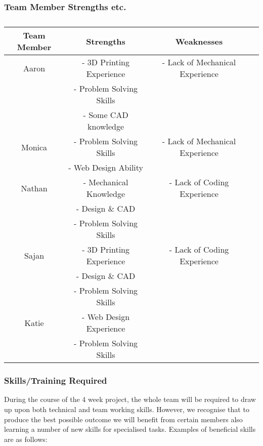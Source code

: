 \documentclass[12pt]{article}
\begin{document}
\subsubsection{Team Member Strengths etc.}
\begin{table}[!h]
\caption{}
\begin{center}
\begin{tabular}{|c|c|c|c|}
\hline
Team Member & Strengths & Weaknesses\\
 \hline
Aaron & - 3D Printing Experience & - Lack of Mechanical Experience\\
& - Problem Solving Skills & \\
& - Some CAD knowledge & \\
\hline
Monica & - Problem Solving Skills & - Lack of Mechanical Experience \\
& - Web Design Ability & \\
\hline
Nathan & - Mechanical Knowledge & - Lack of Coding Experience \\
& - Design \& CAD & \\
& - Problem Solving Skills &\\
\hline
Sajan & - 3D Printing Experience & - Lack of Coding Experience\\
& - Design \& CAD & \\
& - Problem Solving Skills &\\
\hline
Katie & - Web Design Experience & \\
& - Problem Solving Skills &\\
\hline
\end{tabular}
\end{center}
\label{default}
\end{table}

\subsubsection{Skills/Training Required}

During the course of the 4 week project, the whole team will be required to draw up upon both technical and team working skills. However, we recognise that to produce the best possible outcome we will benefit from certain members also learning a number of new skills for specialised tasks. Examples of beneficial skills are as follows:  
\end{document}
